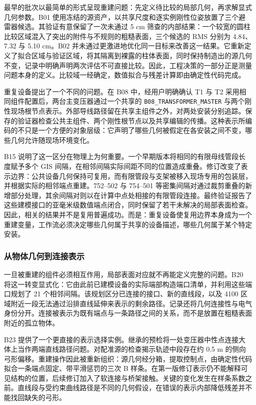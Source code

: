 \documentclass[10pt,a4paper]{article}
\begin{document}
最早的批次以最简单的形式呈现重建问题：先定义待比较的局部几何，再求解显式几何参数。B01
使用冻结的源资产，以共享尺度和逐实例刚性位姿放置了三个避雷器候选。其验证有意保留了一次未通过
5 cm
筛查的内部结果：一个较宽的圆柱比较区域混入了突出的附件与不规则的粗糙表面，三个候选的
RMS 分别为 4.84、7.32 与 5.10 cm。B02
并未通过更激进地优化同一目标来改善这一结果。它重新定义了拟合区域与验证区域，将其隔离到裸露的柱体表面，同时保持制造出的源几何不变，记录中明确声明两次评估不可直接比较。因此，工程决策的一部分正是测量问题本身的定义。比较域一经确定，数值拟合与残差计算即由确定性代码完成。

重复设备提出了一个不同的问题。在 B08 中，经用户明确确认 T1 与 T2
采用相同组件配置后，两台主变压器通过一个共享的
\texttt{B08\_TRANSFORMER\_MASTER}
与两个刚性现场根节点表示。外部导线路径留在共享主组件之外，对两处安装分别追踪。保存的验证器检查公共主组件、两个刚性根节点以及共享编辑的传播。这种表示所编码的不只是一个方便的对象层级：它声明了哪些几何被假定在各安装之间不变，哪些几何允许随现场环境变化。

B15
说明了这一区分在物理上为何重要。一个早期版本将相同的有限母线管段长度赋予多个
GIS
间隔，在相邻间隔实际间距不同的位置造成重叠。修订改变了表示边界：公共设备几何保持可复用，而有限管段与支架被移入现场专用的包装层，并根据实际的相邻端点重建。752--502
与 754--501
等密集间隔对通过裁剪重叠的新增部分处理，其余间隔对则以在计算中点处相接的有限管段连接。最终验证报告了这些建模接口的亚毫米级数值端点闭合，同时保留了若干未解决的局部表面检查。因此，相关的结果并不是复用普遍成功。而是：重复设备使复用边界本身成为一个重建变量，工作流必须决定哪些几何属于共享的设备描述，哪些几何属于某个特定安装。

\hypertarget{ux4eceux7269ux4f53ux51e0ux4f55ux5230ux8fdeux63a5ux8868ux793a}{%
\subsubsection{从物体几何到连接表示}\label{ux4eceux7269ux4f53ux51e0ux4f55ux5230ux8fdeux63a5ux8868ux793a}}

一旦被重建的组件必须相互作用，局部表面对应就不再能定义完整的问题。B20
将这一转变显式化：它由此前已建模设备的实际端部构造端口清单，并利用这些端口规划了
21 个相邻间隔。该规划区分已连接的接口、新的直线段，以及 4100
区域附近一段无法通过沿排直线延伸来表示的剩余路径。记录还将几何连接性与电气身份分开。连接被表示为既有端点与一条路径之间的关系，而不是放置在粗糙表面附近的孤立物体。

B23
提供了一个更直接的表示选择实例。继承的预检将一处变压器中性点连接大体上当作两端直线路径问题。对配准源的检查揭示轨迹中段存在约
0.5 m
的侧向弓形偏移。重建操作因此被重新组织：源几何经分箱，提取控制点，由确定性代码拟合一条端点固定、带平滑惩罚的三次
B
样条。在第一版修订表示仍不能解释可见结构的位置，后续修订加入了软连接与桥架接触。关键的变化发生在样条系数之前。直线段与受约束曲线路径是不同的几何假设，在错误的表示内部降低残差并不能找回缺失的弓形。
\end{document}
